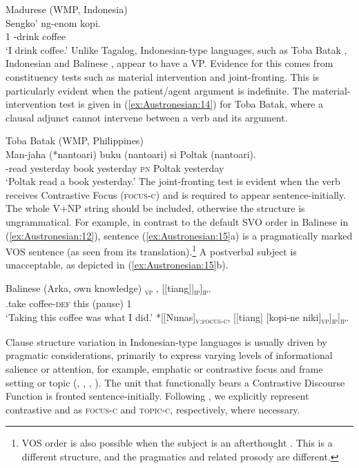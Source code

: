 \documentclass[output=paper,chinesefont]{../langscibook}
\begin{document}
\ea\label{ex:Austronesian:13} Madurese (WMP, Indonesia) \citep[149]{Davies2010}\\
\gll
Sengko' ng-enom kopi.\\
1 \AV-drink coffee\\
\glt`I drink coffee.'
\z
\largerpage[-2]
Unlike Tagalog, Indonesian-type languages, such as Toba Batak \citep{Erlewine2018}, Indonesian \citep{Arka2008} and Balinese \citep{arka2003}, appear to have a VP.  Evidence for this comes from constituency tests such as material intervention and joint-fronting. This is particularly evident when the patient/agent argument is indefinite. The material-intervention test is given in (\ref{ex:Austronesian:14}) for Toba Batak, where a clausal adjunct cannot intervene between a verb and its argument. 

\ea\label{ex:Austronesian:14} Toba Batak (WMP, Philippines)  \citep{Erlewine2018}\\
 \gll Man-jaha (*nantoari) buku (nantoari) si  Poltak (nantoari).\\
 \AV-read \phantom{(*}yesterday book \phantom{(}yesterday \textsc{pn} Poltak \phantom{(}yesterday\\
\glt`Poltak read a book yesterday.'
\z
The joint-fronting test is evident when the verb receives Contrastive Focus {(\textsc{fo\-cus-c})} and is required to appear sentence-initially. The whole V+NP string should be included, otherwise the structure is ungrammatical. For example, in contrast to the default SVO order in Balinese in (\ref{ex:Austronesian:12}), sentence (\ref{ex:Austronesian:15}a) is a pragmatically marked VOS sentence (as seen from its translation).\footnote{VOS order is also possible when the subject is an afterthought \TOPIC. This is a different structure, and the pragmatics and related prosody are different.} A postverbal subject is unacceptable, as depicted in (\ref{ex:Austronesian:15}b).

\ea\label{ex:Austronesian:15} Balinese  (Arka, own knowledge)
 \ea\gll
 [[Nunas kopi-ne niki]\textsubscript{\textsc{vp}} , [[tiang]\textsubscript{\SUBJ}]\textsubscript{\textsc{ip}}]\textsubscript{\textsc{ip}}.\\
 \phantom{[[}\AV.take coffee-\textsc{def} this (pause) \phantom{[[}1 \\
\glt`Taking this coffee was what I did.'
\ex
*[[Nunas]\textsubscript{\textsc{v:focus-c}}, [[tiang]\textsubscript{\SUBJ} [kopi-ne niki]\textsubscript{\textsc{vp}}]\textsubscript{\textsc{ip}}]\textsubscript{\textsc{ip}}.
\z\z

\largerpage[-2]
Clause structure variation in Indonesian-type languages is usually driven by pragmatic considerations, primarily to express varying levels of informational salience or attention, for example, emphatic or contrastive focus and frame setting or topic (\citealt[257--260]{arka2003}, \citealt{Arka2018}, \citealt[175--176]{Davies2010}, \citealt[104--107]{Norwood2002}). The unit that functionally bears a Contrastive Discourse Function is fronted sentence-initially. Following \citet{Arka2021}, we explicitly represent contrastive \FOCUS and \TOPIC as \textsc{focus-c} and \textsc{topic-c}, respectively, where necessary. 
\end{document}
